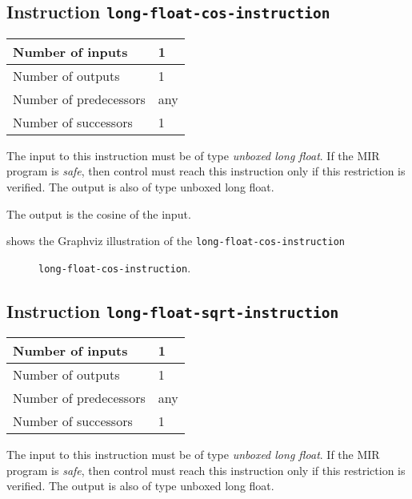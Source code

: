 \subsection{Instruction \texttt{long-float-cos-instruction}}
\label{mir-instruction-long-float-div}

\begin{tabular}{|l|l|}
\hline
Number of inputs & 1\\
\hline
Number of outputs & 1\\
\hline
Number of predecessors & any\\
\hline
Number of successors & 1\\
\hline
\end{tabular}

The input to this instruction must be of type \emph{unboxed long
  float}.  If the MIR program is \emph{safe}, then control must reach
this instruction only if this restriction is verified.  The output is
also of type unboxed long float.

The output is the cosine of the input.

 shows the Graphviz illustration of the
\texttt{long-float-cos-instruction}

\begin{figure}
\begin{center}
\end{center}
\caption{\label{fig-long-float-cos-instruction}
\texttt{long-float-cos-instruction}.}
\end{figure}

\subsection{Instruction \texttt{long-float-sqrt-instruction}}
\label{mir-instruction-long-float-div}

\begin{tabular}{|l|l|}
\hline
Number of inputs & 1\\
\hline
Number of outputs & 1\\
\hline
Number of predecessors & any\\
\hline
Number of successors & 1\\
\hline
\end{tabular}

The input to this instruction must be of type \emph{unboxed long
  float}.  If the MIR program is \emph{safe}, then control must reach
this instruction only if this restriction is verified.  The output is
also of type unboxed long float.

